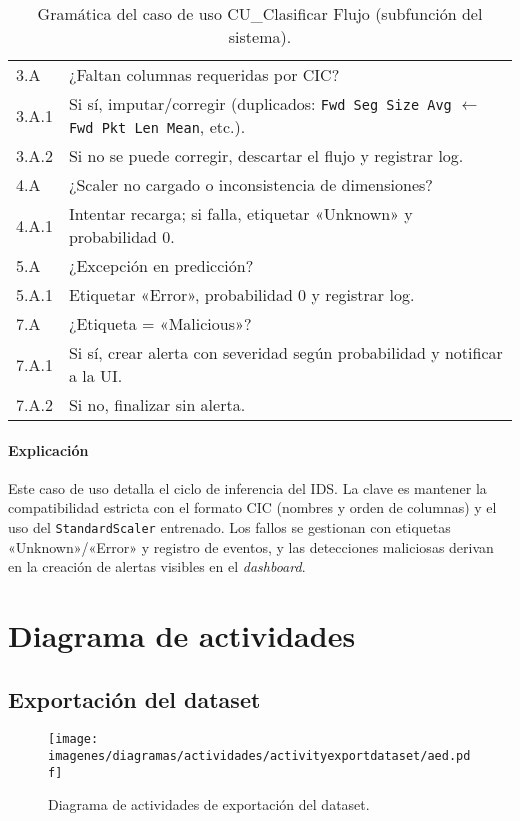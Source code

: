 \begin{table}[H]
\begin{tabular}{p{4.0cm} p{10.5cm}}
3.A & ¿Faltan columnas requeridas por CIC? \\
3.A.1 & Si sí, imputar/corregir (duplicados: \texttt{Fwd Seg Size Avg} $\leftarrow$ \texttt{Fwd Pkt Len Mean}, etc.). \\
3.A.2 & Si no se puede corregir, descartar el flujo y registrar log. \\
4.A & ¿Scaler no cargado o inconsistencia de dimensiones? \\
4.A.1 & Intentar recarga; si falla, etiquetar «Unknown» y probabilidad 0. \\
5.A & ¿Excepción en predicción? \\
5.A.1 & Etiquetar «Error», probabilidad 0 y registrar log. \\
7.A & ¿Etiqueta = «Malicious»? \\
7.A.1 & Si sí, crear alerta con severidad según probabilidad y notificar a la UI. \\
7.A.2 & Si no, finalizar sin alerta. \\
\hline
\end{tabular}
\caption{Gramática del caso de uso CU\_Clasificar Flujo (subfunción del sistema).}
\label{tab:gramatica_clasificar}
\end{table}

\paragraph{Explicación}
Este caso de uso detalla el ciclo de inferencia del IDS. La clave es mantener la compatibilidad estricta con el formato CIC (nombres y orden de columnas) y el uso del \texttt{StandardScaler} entrenado. Los fallos se gestionan con etiquetas «Unknown»/«Error» y registro de eventos, y las detecciones maliciosas derivan en la creación de alertas visibles en el \textit{dashboard}.

\section{Diagrama de actividades}\label{Sec.DiagActividades}
\subsection{Exportación del dataset}

\begin{figure}[H] \centering \texttt{[image: imagenes/diagramas/actividades/activityexportdataset/aed.pdf]} \caption{Diagrama de actividades de exportación del dataset.} \label{fig:diagActED} \end{figure}

